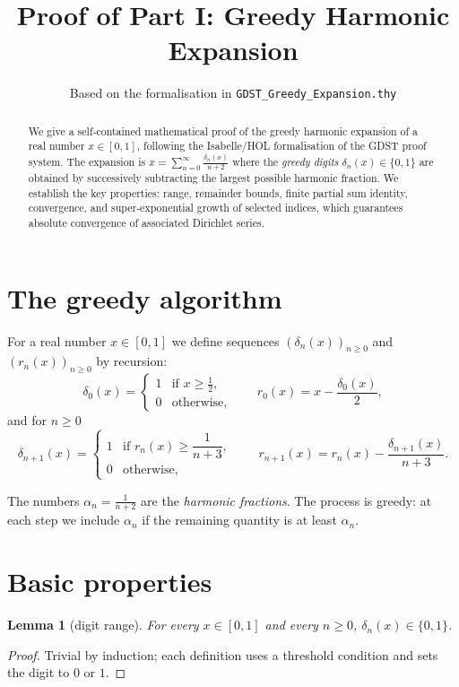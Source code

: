 \documentclass[11pt,a4paper]{article}
\title{Proof of Part I: Greedy Harmonic Expansion}
\author{Based on the formalisation in \texttt{GDST\_Greedy\_Expansion.thy}}
\date{}
\newtheorem{lemma}[theorem]{Lemma}
\theoremstyle{definition}
\theoremstyle{remark}
\begin{document}
\maketitle

\begin{abstract}
We give a self‑contained mathematical proof of the greedy harmonic expansion of a real number \(x\in[0,1]\),
following the Isabelle/HOL formalisation of the GDST proof system. 
The expansion is \(x = \sum_{n=0}^{\infty} \frac{\delta_n(x)}{n+2}\) where the \emph{greedy digits} \(\delta_n(x)\in\{0,1\}\) are obtained by successively subtracting the largest possible harmonic fraction.
We establish the key properties: range, remainder bounds, finite partial sum identity, convergence, and super‑exponential growth of selected indices, which guarantees absolute convergence of associated Dirichlet series.
\end{abstract}

\section{The greedy algorithm}

For a real number \(x\in[0,1]\) we define sequences \((\delta_n(x))_{n\ge0}\) and \((r_n(x))_{n\ge0}\) by recursion:
\[
\delta_0(x) = \begin{cases}
1 &\text{if } x \ge \frac12,\\[2pt]
0 &\text{otherwise},
\end{cases}
\qquad
r_0(x) = x - \frac{\delta_0(x)}{2},
\]
and for \(n\ge 0\)
\[
\delta_{n+1}(x) = \begin{cases}
1 &\text{if } r_n(x) \ge \dfrac{1}{n+3},\\[6pt]
0 &\text{otherwise},
\end{cases}
\qquad
r_{n+1}(x) = r_n(x) - \frac{\delta_{n+1}(x)}{n+3}.
\]

The numbers \(\alpha_n = \frac1{n+2}\) are the \emph{harmonic fractions}.  
The process is greedy: at each step we include \(\alpha_n\) if the remaining quantity is at least \(\alpha_n\).

\section{Basic properties}

\begin{lemma}[digit range]\label{lem:range}
For every \(x\in[0,1]\) and every \(n\ge0\), \(\delta_n(x)\in\{0,1\}\).
\end{lemma}
\begin{proof}
Trivial by induction; each definition uses a threshold condition and sets the digit to \(0\) or \(1\).
\end{proof}
\end{document}
